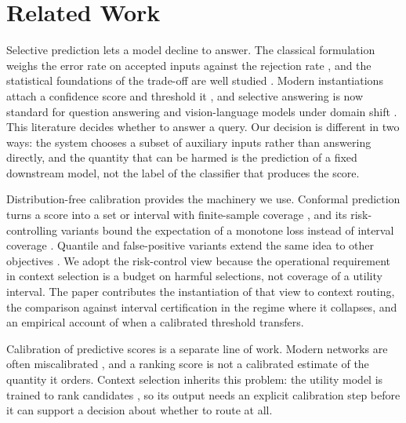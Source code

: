 \section{Related Work}

Selective prediction lets a model decline to answer. The classical formulation
weighs the error rate on accepted inputs against the rejection rate
\citep{chow1970optimum}, and the statistical foundations of the trade-off are
well studied \citep{elyaniv2010foundations,bartlett2008classification,cortes2016learning}.
Modern instantiations attach a confidence score and threshold it
\citep{geifman2017selective,hendrycks2017baseline,gangrade2021selective}, and
selective answering is now standard for question answering and vision-language
models under domain shift \citep{kamath2020selective,whitehead2022reliable}.
This literature decides whether to answer a query. Our decision is different in
two ways: the system chooses a subset of auxiliary inputs rather than answering
directly, and the quantity that can be harmed is the prediction of a fixed
downstream model, not the label of the classifier that produces the score.

Distribution-free calibration provides the machinery we use. Conformal
prediction turns a score into a set or interval with finite-sample coverage
\citep{vovk2005algorithmic,lei2018distribution,angelopoulos2023gentle}, and its
risk-controlling variants bound the expectation of a monotone loss instead of
interval coverage \citep{bates2021distribution,angelopoulos2023conformal}.
Quantile and false-positive variants extend the same idea to other objectives
\citep{snell2023quantile,fisch2022conformal}. We adopt the risk-control view
because the operational requirement in context selection is a budget on
harmful selections, not coverage of a utility interval. The paper contributes
the instantiation of that view to context routing, the comparison against
interval certification in the regime where it collapses, and an empirical
account of when a calibrated threshold transfers.

Calibration of predictive scores is a separate line of work. Modern networks
are often miscalibrated \citep{guo2017calibration}, and a ranking score is not
a calibrated estimate of the quantity it orders. Context selection inherits
this problem: the utility model is trained to rank candidates
\citep{hashimoto-etal-2024-take,liu2022what,rubin2022learning}, so its output
needs an explicit calibration step before it can support a decision about
whether to route at all.

